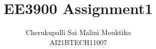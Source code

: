 \documentclass[journal,11pt,twocolumn]{IEEEtran}
\begin{document}
    \newtheorem{theorem}{Theorem}[section]
    \newtheorem{problem}{Problem}
    \newtheorem{proposition}{Proposition}[section]
    \newtheorem{lemma}{Lemma}[section]
    \newtheorem{corollary}[theorem]{Corollary}
    \newtheorem{example}{Example}[section]
    \newtheorem{definition}[problem]{Definition}
    \newcommand{\BEQA}{\begin{eqnarray}}
    \newcommand{\EEQA}{\end{eqnarray}}
    \newcommand{\define}{\stackrel{\triangle}{=}}
    \newcommand*\circled[1]{\tikz[baseline=(char.base)]{
        \node[shape=circle,draw,inner sep=2pt] (char) {#1};}}
    
    \providecommand{\mbf}{\mathbf}
    \providecommand{\pr}[1]{\ensuremath{\Pr\left(#1\right)}}
    \providecommand{\qfunc}[1]{\ensuremath{Q\left(#1\right)}}
    \providecommand{\sbrak}[1]{\ensuremath{{}\left[#1\right]}}
    \providecommand{\lsbrak}[1]{\ensuremath{{}\left[#1\right.}}
    \providecommand{\rsbrak}[1]{\ensuremath{{}\left.#1\right]}}
    \providecommand{\brak}[1]{\ensuremath{\left(#1\right)}}
    \providecommand{\lbrak}[1]{\ensuremath{\left(#1\right.}}
    \providecommand{\rbrak}[1]{\ensuremath{\left.#1\right)}}
    \providecommand{\cbrak}[1]{\ensuremath{\left\{#1\right\}}}
    \providecommand{\lcbrak}[1]{\ensuremath{\left\{#1\right.}}
    \providecommand{\rcbrak}[1]{\ensuremath{\left.#1\right\}}}
    \theoremstyle{remark}
    \newtheorem{rem}{Remark}
    
    
\title{EE3900 Assignment1}
\author{ Cherukupalli Sai Malini Mouktika\\\normalsize AI21BTECH11007 \\ \vspace*{10pt} \Large }



\maketitle
\end{document}
